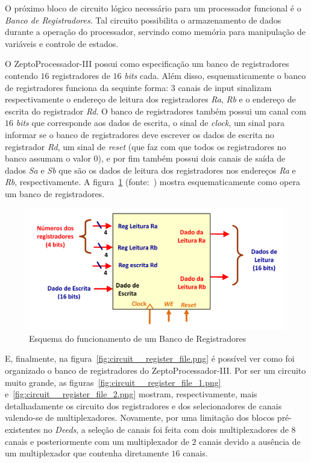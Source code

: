\documentclass[12pt]{article}
\begin{document}
O próximo bloco de circuito lógico necessário para um processador funcional é o
\emph{Banco de Registradores}. Tal circuito possibilita o armazenamento de dados
durante a operação do processador, servindo como memória para manipulação de
variáveis e controle de estados.

O ZeptoProcessador-III possui como especificação um banco de registradores
contendo $16$ registradores de $16$ \emph{bits} cada. Além disso,
esquematicamente o banco de registradores funciona da sequinte forma: $3$ canais
de input sinalizam respectivamente o endereço de leitura dos registradores
\emph{Ra}, \emph{Rb} e o endereço de escrita do registrador \emph{Rd}. O banco
de registradores também possui um canal com $16$ \emph{bits} que corresponde aos
dados de escrita, o sinal de \emph{clock}, um sinal para informar se o banco de
registradores deve escrever os dados de escrita no registrador \emph{Rd}, um
sinal de \emph{reset} (que faz com que todos os registradores no banco assumam o
valor $0$), e por fim também possui dois canais de saída de dados \emph{Sa} e
\emph{Sb} que são os dados de leitura dos registradores nos endereços \emph{Ra}
e \emph{Rb}, respectivamente. A figura~\ref{fig:diagram__register_file.png}
(fonte:~\cite{Diagram_Register_file}) mostra esquematicamente como opera um
banco de registradores.

\begin{figure}[H]
    \centering
    \includegraphics[width=.9\textwidth]{Projeto/images/diagram__register_file.png}
    \caption{Esquema do funcionamento de um Banco de Registradores}\label{fig:diagram__register_file.png}
\end{figure}

E, finalmente, na figura~\ref{fig:circuit__register_file.png} é possível ver
como foi organizado o banco de registradores do ZeptoProcessador-III. Por ser um
circuito muito grande, as figuras~\ref{fig:circuit__register_file_1.png}
e~\ref{fig:circuit__register_file_2.png} mostram, respectivamente, mais
detalhadamente os circuito dos registradores e dos selecionadores de canais
valendo-se de multiplexadores. Novamente, por uma limitação dos blocos
pré-existentes no \emph{Deeds}, a seleção de canais foi feita com dois
multiplexadores de $8$ canais e posteriormente com um multiplexador de $2$
canais devido a ausência de um multiplexador que contenha diretamente $16$
canais.
\end{document}

